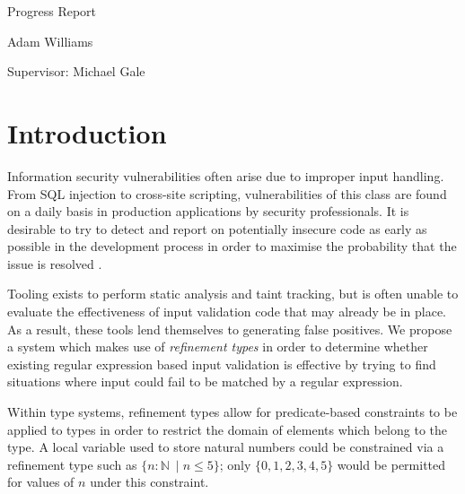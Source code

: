 \documentclass[a4paper]{article}
\begin{document}
\begin{titlepage}
    {\par}
    \vspace{1.25cm}
    \vspace{3.5cm}
    {\hspace{0.75cm}\Huge \sffamily Progress Report}
    \vspace{0.16cm}
    {\par}
    {\hspace{0.75cm}\large \sffamily Adam Williams}
    
    \vspace{0cm}
    {\par}
    {\hspace{0.75cm}\large \sffamily Supervisor: Michael Gale}
    \vfill
\end{titlepage}
\restoregeometry
\restorepagecolor
\tableofcontents
\pagebreak[5]
    
    \section{Introduction}
    
    Information security vulnerabilities often arise due to improper input handling. From SQL injection to cross-site scripting, vulnerabilities of this class are found on a daily basis in production applications by security professionals. It is desirable to try to detect and report on potentially insecure code as early as possible in the development process in order to maximise the probability that the issue is resolved \citep{Sadowski:2018:LBS:3200906.3188720}.
    
    Tooling exists to perform static analysis and taint tracking, but is often unable to evaluate the effectiveness of input validation code that may already be in place. As a result, these tools lend themselves to generating false positives. We propose a system which makes use of \emph{refinement types} in order to determine whether existing regular expression based input validation is effective by trying to find situations where input could fail to be matched by a regular expression.
    
    Within type systems, refinement types allow for predicate-based constraints to be applied to types in order to restrict the domain of elements which belong to the type. A local variable used to store natural numbers could be constrained via a refinement type such as $\{n: \mathbb{N}\ \mid n \leq 5\}$;  only $\{0, 1, 2, 3, 4, 5\}$ would be permitted for values of $n$ under this constraint.
    
\end{document}
